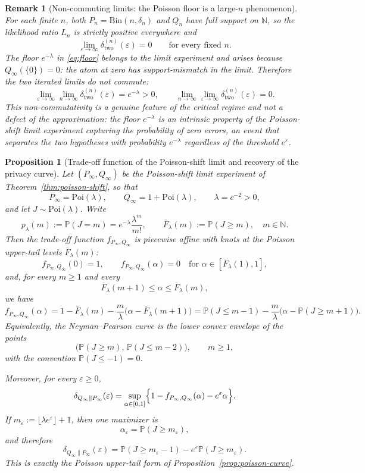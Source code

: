 \documentclass{article}
\newtheorem{proposition}[theorem]{Proposition}
\newtheorem{remark}[theorem]{Remark}
\begin{document}
\begin{remark}[Non-commuting limits: the Poisson floor is a large-$n$ phenomenon]
\label{rem:noncommuting-limits}
For each finite $n$, both $P_n = \mathrm{Bin}(n,\delta_n)$ and $Q_n$ have full support on $\mathbb{N}$,
so the likelihood ratio $L_n$ is strictly positive everywhere and
\[
\lim_{\varepsilon \to \infty} \delta^{(n)}_{\mathrm{two}}(\varepsilon) = 0 \qquad \text{for every fixed } n.
\]
The floor $e^{-\lambda}$ in \eqref{eq:floor} belongs to the \emph{limit experiment} and arises because
$Q_\infty(\{0\}) = 0$: the atom at zero has support-mismatch in the limit. Therefore the two iterated
limits do not commute:
\[
\lim_{\varepsilon \to \infty}\lim_{n \to \infty} \delta^{(n)}_{\mathrm{two}}(\varepsilon)
= e^{-\lambda} > 0,
\qquad
\lim_{n \to \infty}\lim_{\varepsilon \to \infty} \delta^{(n)}_{\mathrm{two}}(\varepsilon) = 0.
\]
This non-commutativity is a genuine feature of the critical regime and not a defect of the approximation:
the floor $e^{-\lambda}$ is an intrinsic property of the Poisson-shift limit experiment capturing
the probability of zero errors, an event that separates the two hypotheses with probability $e^{-\lambda}$
regardless of the threshold $e^\varepsilon$.
\end{remark}

\begin{proposition}[Trade-off function of the Poisson-shift limit and recovery of the privacy curve]
\label{prop:poisson-tradeoff}
Let $(P_\infty,Q_\infty)$ be the Poisson-shift limit experiment of Theorem~\ref{thm:poisson-shift}, so that
\[
P_\infty=\mathrm{Poi}(\lambda),
\qquad
Q_\infty=1+\mathrm{Poi}(\lambda),
\qquad \lambda=c^{-2}>0,
\]
and let $J\sim \mathrm{Poi}(\lambda)$. Write
\[
p_\lambda(m):=\mathbb P(J=m)=e^{-\lambda}\frac{\lambda^m}{m!},
\qquad
\overline F_\lambda(m):=\mathbb P(J\ge m),\quad m\in\mathbb N.
\]
Then the trade-off function $f_{P_\infty,Q_\infty}$ is piecewise affine with knots at the Poisson upper-tail levels $\overline F_\lambda(m)$:
\[
f_{P_\infty,Q_\infty}(0)=1,
\qquad
f_{P_\infty,Q_\infty}(\alpha)=0\quad\text{for }\alpha\in[\overline F_\lambda(1),1],
\]
and, for every $m\ge 1$ and every
\[
\overline F_\lambda(m+1)\le \alpha\le \overline F_\lambda(m),
\]
we have
\[
f_{P_\infty,Q_\infty}(\alpha)
=1-\overline F_\lambda(m)-\frac{m}{\lambda}\bigl(\alpha-\overline F_\lambda(m+1)\bigr)
=\mathbb P(J\le m-1)-\frac{m}{\lambda}\bigl(\alpha-\mathbb P(J\ge m+1)\bigr).
\]
Equivalently, the Neyman--Pearson curve is the lower convex envelope of the points
\[
\bigl(\mathbb P(J\ge m),\, \mathbb P(J\le m-2)\bigr),\qquad m\ge 1,
\]
with the convention $\mathbb P(J\le -1)=0$.

Moreover, for every $\varepsilon\ge 0$,
\[
\delta_{Q_\infty\|P_\infty}(\varepsilon)
=\sup_{\alpha\in[0,1]}\Bigl\{1-f_{P_\infty,Q_\infty}(\alpha)-e^\varepsilon\alpha\Bigr\}.
\]
If $m_\varepsilon:=\lfloor \lambda e^\varepsilon\rfloor+1$, then one maximizer is
\[
\alpha_\varepsilon=\mathbb P(J\ge m_\varepsilon),
\]
and therefore
\[
\delta_{Q_\infty\|P_\infty}(\varepsilon)
=\mathbb P(J\ge m_\varepsilon-1)-e^\varepsilon\mathbb P(J\ge m_\varepsilon).
\]
This is exactly the Poisson upper-tail form of Proposition~\ref{prop:poisson-curve}.
\end{proposition}
\end{document}
